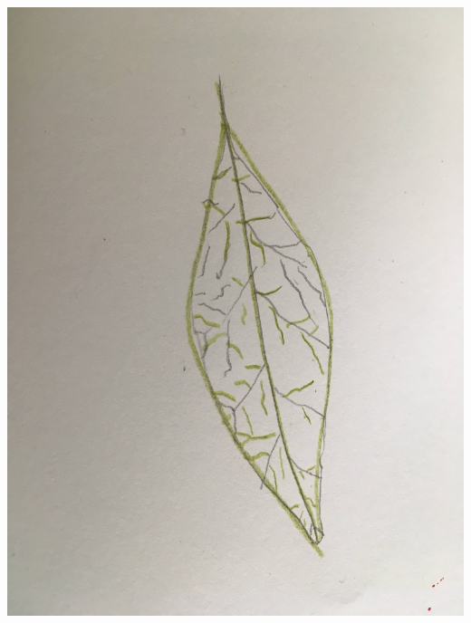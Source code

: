 \documentclass[12pt, letter]{article}
\begin{document}
\includegraphics[width=\textwidth,height=\textheight,keepaspectratio]{leaf-lines.jpg}
\newpage
\end{document}

